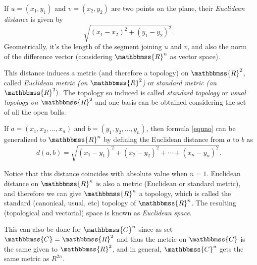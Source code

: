 \documentclass{article}
\newcommand{\C}{\mathbbmss{C}}
\newcommand{\R}{\mathbbmss{R}}
\newcommand{\mathbb}[1]{\mathbbmss{#1}}
\begin{document}
If $u=(x_1,y_1)$ and $v=(x_2,y_2)$ are two points on the plane, their \emph{Euclidean distance} is given by 
\begin{equation}\label{equno}
\sqrt{(x_1-x_2)^2 + (y_1-y_2)^2}.
\end{equation}
Geometrically, it's the length of the segment joining $u$ and $v$, and also the norm of the difference vector (considering $\R^n$ as vector space).

This distance induces a metric (and therefore a topology) on $\mathbb{R}^2$, called \emph{Euclidean metric (on $\R^2$)} or \emph{standard metric (on $\mathbb{R}^2)$}. The topology so induced is called \emph{standard topology} or \emph{usual topology on $\R^2$} and one basis can be obtained considering the set of all the open balls.

If $a=(x_1,x_2,\ldots,x_n)$ and $b=(y_1,y_2,\ldots,y_n)$, then formula \ref{equno} can be generalized to $\R^n$ by defining the Euclidean distance from $a$ to $b$ as
\begin{equation}d(a,b)=\sqrt{(x_1-y_1)^2+(x_2-y_2)^2+\cdots+(x_n-y_n)^2}.\end{equation}

Notice that this distance coincides with absolute value when $n=1$.
Euclidean distance on $\mathbb{R}^n$ is also a metric (Euclidean or standard metric), and therefore we can give $\mathbb{R}^n$ a topology, which is called the standard (canonical, usual, etc) topology of $\mathbb{R}^n$. The resulting (topological and vectorial) space is known as \emph{Euclidean space}.

This can also be done for $\C^n$ since as set $\C=\R^2$ and thus the metric on $\C$ is the same given to $\R^2$, and in general, $\C^n$ gets the same metric as $R^{2n}$.
\end{document}
